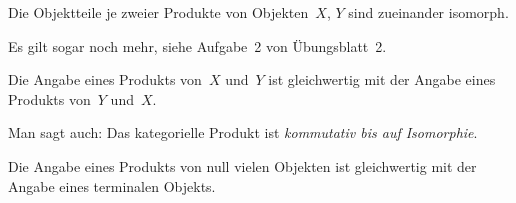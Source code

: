 \begin{prop}Die Objektteile je zweier Produkte von Objekten~$X$, $Y$ sind
zueinander isomorph.\end{prop}

\begin{bem}Es gilt sogar noch mehr, siehe Aufgabe~2 von Übungsblatt~2.\end{bem}

\begin{prop}\label{prodkomm}Die Angabe eines Produkts von~$X$ und~$Y$ ist gleichwertig mit der
Angabe eines Produkts von~$Y$ und~$X$.\end{prop}
Man sagt auch: Das kategorielle Produkt ist \emph{kommutativ bis auf
Isomorphie}.

\begin{prop}Die Angabe eines Produkts von null vielen Objekten ist gleichwertig
mit der Angabe eines terminalen Objekts.\end{prop}

